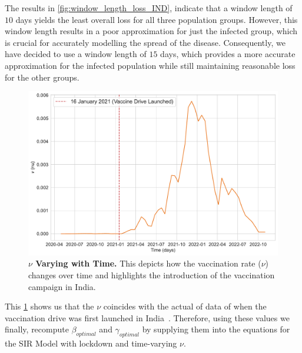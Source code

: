\documentclass[tikz,fleqn,12pt]{wlscirep}
\begin{document}
The results in \cref{fig:window_length_loss_IND}, indicate that a window length of $10$ days yields the least overall loss for all three population groups. However, this window length results in a poor approximation for just the infected group, which is crucial for accurately modelling the spread of the disease. Consequently, we have decided to use a window length of $15$ days, which provides a more accurate approximation for the infected population while still maintaining reasonable loss for the other groups.

\begin{figure}[htbp!]
  \centering
  \includegraphics[scale=0.35]{images/interpolated_nu_varying_with_time_IND.pdf}
  \caption{\textbf{$\nu$ Varying with Time.} This depicts how the vaccination rate ($\nu$) changes over time and highlights the introduction of the vaccination campaign in India.}
  \label{fig:interpolated_nu_varying_with_time_IND}
\end{figure}

This \cref{fig:interpolated_nu_varying_with_time_IND} shows us that the $\nu$ coincides with the actual of data of when the vaccination drive was first launched in India~\cite{UnicefCovidVaccine,PIBCovidVaccine,WikipediaCovidVaccine}. Therefore, using these values we finally, recompute $\beta_{optimal}$ and $\gamma_{optimal}$ by supplying them into the equations for the SIR Model with lockdown and time-varying $\nu$.
\end{document}
